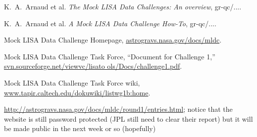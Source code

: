 \documentclass[11pt]{article}
\begin{document}
\begin{thebibliography}{6}

 K.~A.~Arnaud et al. \emph{The Mock LISA Data Challenges: An overview}, gr-qc/....

 K.~A.~Arnaud et al. \emph{A Mock LISA Data Challenge How-To}, gr-qc/....

 Mock LISA Data Challenge Homepage, \url{astrogravs.nasa.gov/docs/mldc}.

 Mock LISA Data Challenge Task Force, ``Document for Challenge 1,'' \url{svn.sourceforge.net/viewvc/lisato
ols/Docs/challenge1.pdf}.

 Mock LISA Data Challenge Task Force wiki, \url{www.tapir.caltech.edu/dokuwiki/listwg1b:home}.

 \url{http://astrogravs.nasa.gov/docs/mldc/round1/entries.html}; notice that the website is still password protected (JPL still need to clear their report) but it will be made public in the next week or so (hopefully)

\end{thebibliography}
\end{document}
